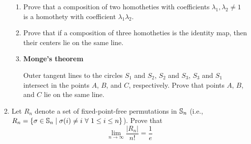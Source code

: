 \documentclass[../apprentice.tex]{subfiles}
\begin{document}
\begin{enumerate}
\begin{enumerate}
        \item Prove that a composition of two homotheties with coefficients $\lambda_1,\lambda_2\neq 1$ is a homothety with coefficient $\lambda_1\lambda_2$.
        \item Prove that if a composition of three homotheties is the identity map, then their centers lie on the same line.
        \item \textbf{Monge's theorem}\par
        Outer tangent lines to the circles $S_1$ and $S_2$, $S_2$ and $S_3$, $S_3$ and $S_1$ intersect in the points $A$, $B$, and $C$, respectively. Prove that points $A$, $B$, and $C$ lie on the same line.
    \end{enumerate} 
    \item Let $R_n$ denote a set of fixed-point-free permutations in $\mathbb{S}_n$ (i.e., $R_n=\{\sigma\in\Ss_n\mid\sigma(i)\neq i\ \forall\ 1\leq i\leq n\}$). Prove that
    \begin{equation*}
        \lim_{n\to\infty}\frac{|R_n|}{n!} = \frac{1}{e}
    \end{equation*}
\end{enumerate}
\end{document}
